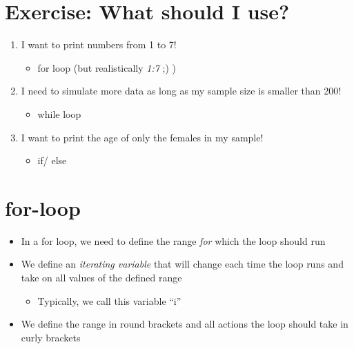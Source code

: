 \documentclass[
]{book}
\providecommand{\tightlist}{%
  \setlength{\itemsep}{0pt}\setlength{\parskip}{0pt}}
\begin{document}
\section{Exercise: What should I use?}\label{exercise-what-should-i-use}

\begin{enumerate}
\def\labelenumi{\arabic{enumi}.}
\tightlist
\item
  I want to print numbers from 1 to 7!

  \begin{itemize}
  \tightlist
  \item
    for loop (but realistically \emph{1:7} ;) )
  \end{itemize}
\item
  I need to simulate more data as long as my sample size is smaller than 200!

  \begin{itemize}
  \tightlist
  \item
    while loop
  \end{itemize}
\item
  I want to print the age of only the females in my sample!

  \begin{itemize}
  \tightlist
  \item
    if/ else
  \end{itemize}
\end{enumerate}

\section{for-loop}\label{for-loop}

\begin{itemize}
\tightlist
\item
  In a for loop, we need to define the range \emph{for} which the loop should run
\item
  We define an \emph{iterating variable} that will change each time the loop runs and take on all values of the defined range

  \begin{itemize}
  \tightlist
  \item
    Typically, we call this variable ``i''
  \end{itemize}
\item
  We define the range in round brackets and all actions the loop should take in curly brackets
\end{itemize}
\end{document}
